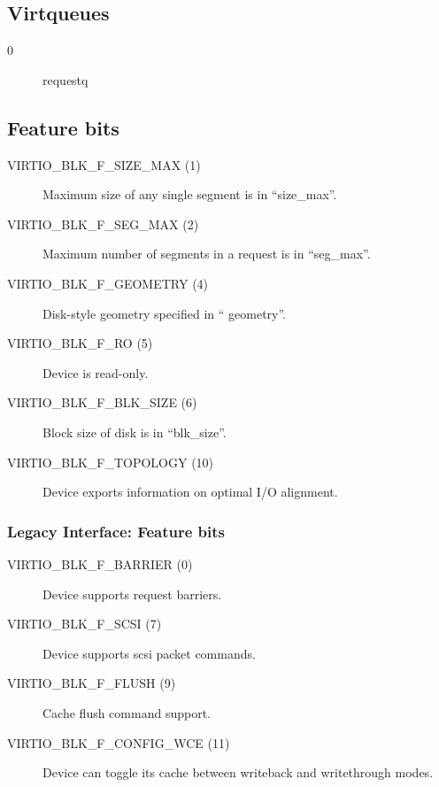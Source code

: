 \subsection{Virtqueues}\label{sec:Device Types / Block Device / Virtqueues}
\begin{description}
\item[0] requestq
\end{description}

\subsection{Feature bits}\label{sec:Device Types / Block Device / Feature bits}

\begin{description}
\item[VIRTIO_BLK_F_SIZE_MAX (1)] Maximum size of any single segment is
    in “size_max”.

\item[VIRTIO_BLK_F_SEG_MAX (2)] Maximum number of segments in a
    request is in “seg_max”.

\item[VIRTIO_BLK_F_GEOMETRY (4)] Disk-style geometry specified in “
    geometry”.

\item[VIRTIO_BLK_F_RO (5)] Device is read-only.

\item[VIRTIO_BLK_F_BLK_SIZE (6)] Block size of disk is in “blk_size”.

\item[VIRTIO_BLK_F_TOPOLOGY (10)] Device exports information on optimal I/O
    alignment.
\end{description}

\subsubsection{Legacy Interface: Feature bits}\label{sec:Device Types / Block Device / Feature bits / Legacy Interface: Feature bits}

\begin{description}
\item[VIRTIO_BLK_F_BARRIER (0)] Device supports request barriers.

\item[VIRTIO_BLK_F_SCSI (7)] Device supports scsi packet commands.

\item[VIRTIO_BLK_F_FLUSH (9)] Cache flush command support.

\item[VIRTIO_BLK_F_CONFIG_WCE (11)] Device can toggle its cache between writeback
    and writethrough modes.
\end{description}

